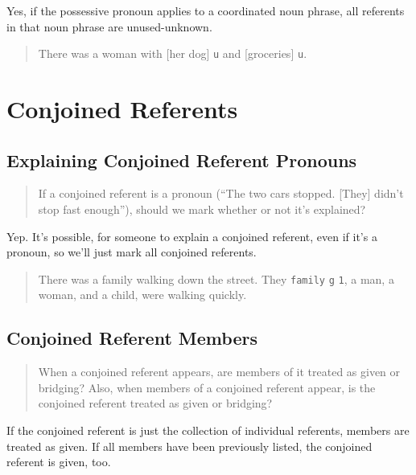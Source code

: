 \documentclass[
]{book}
\begin{document}
Yes,
if the possessive pronoun applies to a coordinated noun phrase,
all referents in that noun phrase are unused-unknown.

\begin{quote}
There was a woman with {[}her dog{]} \texttt{u} and {[}groceries{]} \texttt{u}.
\end{quote}

\hypertarget{conjoined-referents}{%
\section{Conjoined Referents}\label{conjoined-referents}}

\hypertarget{explaining-conjoined-referent-pronouns}{%
\subsection{Explaining Conjoined Referent Pronouns}\label{explaining-conjoined-referent-pronouns}}

\begin{quote}
If a conjoined referent is a pronoun
(``The two cars stopped. {[}They{]} didn't stop fast enough''),
should we mark whether or not it's explained?
\end{quote}

Yep.
It's possible, for someone to explain a conjoined referent, even if it's a pronoun, so we'll just mark all conjoined referents.

\begin{quote}
There was a family walking down the street.
They \texttt{family} \texttt{g} \texttt{1}, a man, a woman, and a child, were walking quickly.
\end{quote}

\hypertarget{conjoined-referent-members}{%
\subsection{Conjoined Referent Members}\label{conjoined-referent-members}}

\begin{quote}
When a conjoined referent appears, are members of it treated as given or bridging?
Also, when members of a conjoined referent appear, is the conjoined referent treated as given or bridging?
\end{quote}

If the conjoined referent is just the collection of individual referents, members are treated as given.
If all members have been previously listed, the conjoined referent is given, too.
\end{document}
